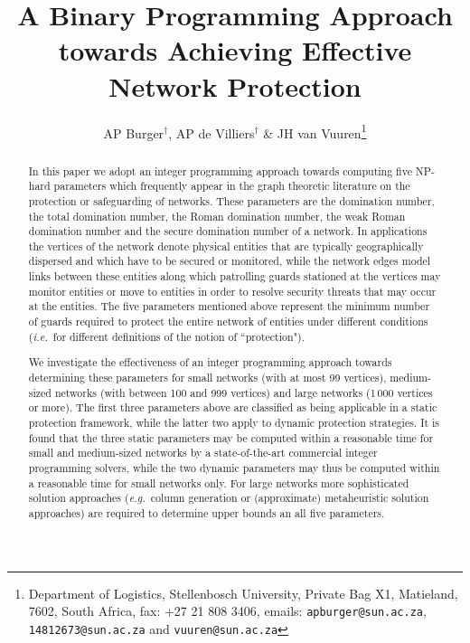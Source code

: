 \documentclass[10pt,a4paper]{article}
\title{{\vspace{-0.5cm}}A Binary Programming Approach towards Achieving Effective Network Protection}
\author{AP Burger$^\dagger$, AP de Villiers$^\dagger$ \& JH van Vuuren\thanks{Department of Logistics, Stellenbosch University, Private Bag X1, Matieland, 7602, South Africa, fax: +27 21 808 3406, emails: {\tt apburger@sun.ac.za}, {\tt 14812673@sun.ac.za} and {\tt vuuren@sun.ac.za}}}
\begin{document}
\maketitle

\begin{abstract} In this paper we adopt an integer programming approach towards computing five NP-hard parameters which frequently appear in the graph theoretic literature on the protection or safeguarding of networks.  These parameters are the domination number, the total domination number, the Roman domination number, the weak Roman domination number and the secure domination number of a network. In applications the vertices of the network denote physical entities that are typically geographically dispersed and which have to be secured or monitored, while the network edges model links between these entities along which patrolling guards stationed at the vertices may monitor entities or move to entities in order to resolve security threats that may occur at the entities.  The five parameters mentioned above represent the minimum number of guards required to protect the entire network of entities under different conditions ({\em i.e.}\ for different definitions of the notion of ``protection").

We investigate the effectiveness of an integer programming approach towards determining these parameters for small networks (with at most 99 vertices), medium-sized networks (with between 100 and 999 vertices) and large networks (1\,000 vertices or more). The first three parameters above are classified as being applicable in a static protection framework, while the latter two apply to dynamic protection strategies.  It is found that the three static parameters may be computed within a reasonable time for small and medium-sized networks by a state-of-the-art commercial integer programming solvers, while the two dynamic parameters may thus be computed within a reasonable time for small networks only. For large networks more sophisticated solution approaches ({\em e.g.}\ column generation or (approximate) metaheuristic solution approaches) are required to determine upper bounds an all five parameters.
  \end{abstract}
 
\end{document}
